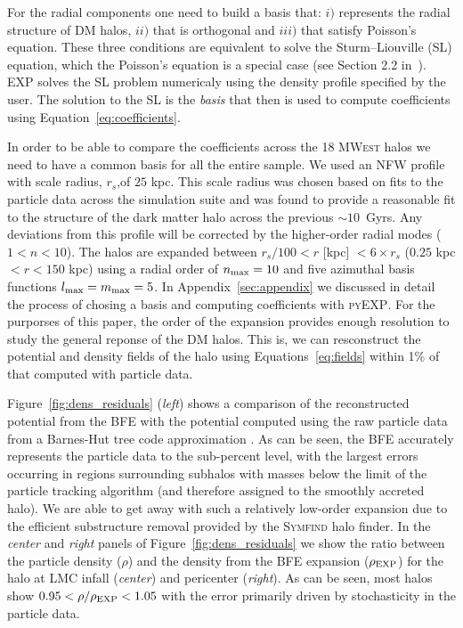 \documentclass[twocolumn, linenumbers]{openjournal}
\newcommand{\mwest}{\textsc{MWest }}
\newcommand{\expcode}{\textsc{EXP }}
\begin{document}
For the radial components one need to build a basis that: $i)$ represents the radial structure of DM halos, $ii)$ that is 
orthogonal and $iii)$ that satisfy Poisson's equation. These three conditions are
equivalent to solve the Sturm--Liouville (SL) equation, which the Poisson's 
equation is a special case (see Section 2.2 in~\cite{Weinberg1999}). \expcode solves
the SL problem numericaly using the density profile specified by the user. The solution 
to the SL is the \textit{basis} that then is used to compute coefficients using 
Equation~\ref{eq:coefficients}. 

In order to be able to compare the coefficients across the 18 \mwest halos we need to have a common 
basis for all the entire sample. We used an NFW profile with scale radius, $r_s$,of $25$ kpc. 
This scale radius was chosen based on fits to the particle data across the simulation suite and was found to provide a reasonable fit 
to the structure of the dark matter halo across the previous $\sim 10$~Gyrs. Any deviations from 
this profile will be corrected by the higher-order radial modes ($1 < n < 10$). The halos are 
expanded between $r_s/100 < r$ [kpc] $< 6\times r_s$ ($0.25$ kpc $< r < 150$ kpc) using a radial 
order of $n_{\rm max} = 10$ and five azimuthal basis functions $l_{\rm max} = m_{\rm max} = 5$. 
In Appendix~\ref{sec:appendix} we discussed in detail the process of chosing a basis and computing
coefficients with \textsc{pyEXP}. For the purporses of this paper, the order of the expansion 
provides enough resolution to study the general reponse of the DM halos. This is, 
we can resconstruct the potential and density fields of the halo 
using Equations~\ref{eq:fields} within 1\% of that computed with particle data. 

Figure~\ref{fig:dens_residuals} (\emph{left}) shows a comparison of the reconstructed potential 
from the BFE with the potential computed using the raw particle data from a Barnes-Hut tree 
code approximation \citep{Grudic2021}. As can be seen, the BFE accurately represents 
the particle data to the sub-percent level, with the largest errors occurring in regions 
surrounding subhalos with masses below the limit of the particle tracking algorithm (and 
therefore assigned to the smoothly accreted halo). We are able to get away with such a 
relatively low-order expansion due to the efficient substructure removal provided by the 
\textsc{Symfind} halo finder. In the \emph{center} and \emph{right} panels of 
Figure~\ref{fig:dens_residuals} we show the ratio between the particle density ($\rho$) and 
the density from the BFE expansion ($\rho_{\rm EXP}$) for the halo at LMC infall (\emph{center}) 
and pericenter (\emph{right}). As can be seen, most halos show $0.95 < \rho/\rho_{\rm EXP} < 1.05$ 
with the error primarily driven by stochasticity in the particle data. 
\end{document}
